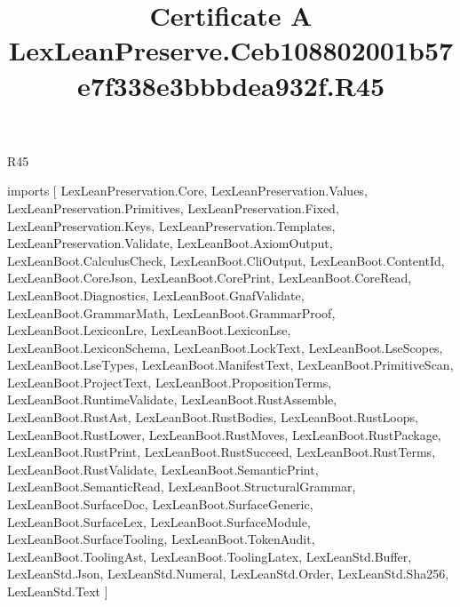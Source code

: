 \begin{lexlean}{R45}
\title{Certificate A LexLeanPreserve.Ceb108802001b57e7f338e3bbbdea932f.R45}
\begin{coremodule}
imports [
  LexLeanPreservation.Core,
  LexLeanPreservation.Values,
  LexLeanPreservation.Primitives,
  LexLeanPreservation.Fixed,
  LexLeanPreservation.Keys,
  LexLeanPreservation.Templates,
  LexLeanPreservation.Validate,
  LexLeanBoot.AxiomOutput,
  LexLeanBoot.CalculusCheck,
  LexLeanBoot.CliOutput,
  LexLeanBoot.ContentId,
  LexLeanBoot.CoreJson,
  LexLeanBoot.CorePrint,
  LexLeanBoot.CoreRead,
  LexLeanBoot.Diagnostics,
  LexLeanBoot.GnafValidate,
  LexLeanBoot.GrammarMath,
  LexLeanBoot.GrammarProof,
  LexLeanBoot.LexiconLre,
  LexLeanBoot.LexiconLse,
  LexLeanBoot.LexiconSchema,
  LexLeanBoot.LockText,
  LexLeanBoot.LseScopes,
  LexLeanBoot.LseTypes,
  LexLeanBoot.ManifestText,
  LexLeanBoot.PrimitiveScan,
  LexLeanBoot.ProjectText,
  LexLeanBoot.PropositionTerms,
  LexLeanBoot.RuntimeValidate,
  LexLeanBoot.RustAssemble,
  LexLeanBoot.RustAst,
  LexLeanBoot.RustBodies,
  LexLeanBoot.RustLoops,
  LexLeanBoot.RustLower,
  LexLeanBoot.RustMoves,
  LexLeanBoot.RustPackage,
  LexLeanBoot.RustPrint,
  LexLeanBoot.RustSucceed,
  LexLeanBoot.RustTerms,
  LexLeanBoot.RustValidate,
  LexLeanBoot.SemanticPrint,
  LexLeanBoot.SemanticRead,
  LexLeanBoot.StructuralGrammar,
  LexLeanBoot.SurfaceDoc,
  LexLeanBoot.SurfaceGeneric,
  LexLeanBoot.SurfaceLex,
  LexLeanBoot.SurfaceModule,
  LexLeanBoot.SurfaceTooling,
  LexLeanBoot.TokenAudit,
  LexLeanBoot.ToolingAst,
  LexLeanBoot.ToolingLatex,
  LexLeanStd.Buffer,
  LexLeanStd.Json,
  LexLeanStd.Numeral,
  LexLeanStd.Order,
  LexLeanStd.Sha256,
  LexLeanStd.Text
]


\end{coremodule}
\end{lexlean}
